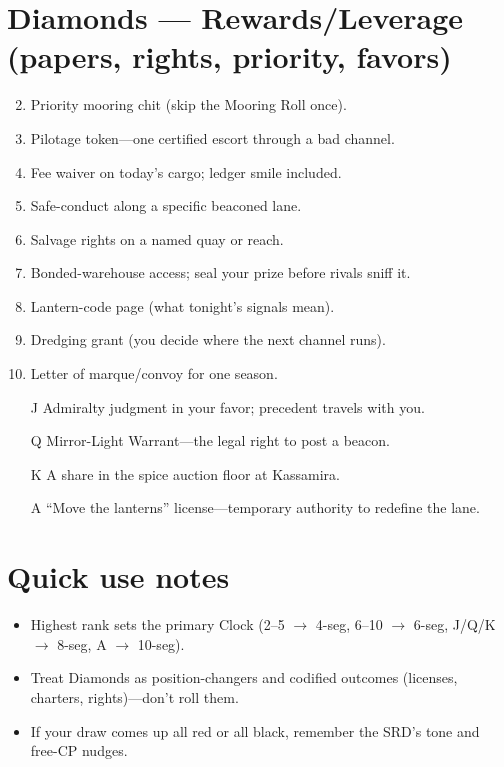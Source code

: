 \section*{Diamonds --- Rewards/Leverage (papers, rights, priority, favors)}
\begin{enumerate}
\setcounter{enumi}{1}
\item Priority mooring chit (skip the Mooring Roll once).
\item Pilotage token---one certified escort through a bad channel.
\item Fee waiver on today's cargo; ledger smile included.
\item Safe-conduct along a specific beaconed lane.
\item Salvage rights on a named quay or reach.
\item Bonded-warehouse access; seal your prize before rivals sniff it.
\item Lantern-code page (what tonight's signals mean).
\item Dredging grant (you decide where the next channel runs).
\item Letter of marque/convoy for one season.
\item[J] Admiralty judgment in your favor; precedent travels with you.
\item[Q] Mirror-Light Warrant---the legal right to post a beacon.
\item[K] A share in the spice auction floor at Kassamira.
\item[A] ``Move the lanterns'' license---temporary authority to redefine the lane.
\end{enumerate}

\section*{Quick use notes}
\begin{itemize}
\item Highest rank sets the primary Clock (2--5 $\rightarrow$ 4-seg, 6--10 $\rightarrow$ 6-seg, J/Q/K $\rightarrow$ 8-seg, A $\rightarrow$ 10-seg).
\item Treat Diamonds as position-changers and codified outcomes (licenses, charters, rights)---don't roll them.
\item If your draw comes up all red or all black, remember the SRD's tone and free-CP nudges.
\end{itemize}
